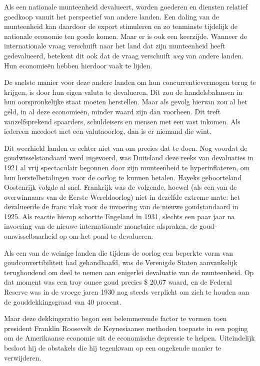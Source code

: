 \documentclass[smalldemyvopaper,11pt,twoside,onecolumn,openright,extrafontsizes,hidelinks]{memoir}
\begin{document}
Als een nationale munteenheid devalueert, worden goederen en diensten
relatief goedkoop vanuit het perspectief van andere landen. Een daling
van de munteenheid kan daardoor de export stimuleren en zo tenminste
tijdelijk de nationale economie ten goede komen. Maar er is ook een
keerzijde. Wanneer de internationale vraag verschuift naar het land dat
zijn munteenheid heeft gedevalueerd, betekent dit ook dat de vraag
verschuift \emph{weg} van andere landen. Hun economieën hebben hierdoor
vaak te lijden.

De snelste manier voor deze andere landen om hun concurrentievermogen
terug te krijgen, is door hun eigen valuta te devalueren. Dit zou de
handelsbalansen in hun oorspronkelijke staat moeten herstellen. Maar als
gevolg hiervan zou al het geld, in al deze economieën, minder waard zijn
dan voorheen. Dit treft vanzelfsprekend spaarders, schuldeisers en
mensen met een vast inkomen. Als iedereen meedoet met een valutaoorlog,
dan is er niemand die wint.

Dit weerhield landen er echter niet van om precies dat te doen. Nog
voordat de goudwisselstandaard werd ingevoerd, was Duitsland deze reeks
van devaluaties in 1921 al vrij spectaculair begonnen door zijn
munteenheid te hyperinflateren, om hun herstelbetalingen voor de oorlog
te kunnen betalen. Hayeks geboorteland Oostenrijk volgde al snel.
Frankrijk was de volgende, hoewel (als een van de overwinnaars van de
Eerste Wereldoorlog) niet in dezelfde extreme mate: het devalueerde de
franc vlak voor de invoering van de nieuwe goudstandaard in 1925. Als
reactie hierop schortte Engeland in 1931, slechts een paar jaar na
invoering van de nieuwe internationale monetaire afspraken, de
goud-omwisselbaarheid op om het pond te devalueren.

Als een van de weinige landen die tijdens de oorlog een beperkte vorm
van goudconvertibiliteit had gehandhaafd, was de Verenigde Staten
aanvankelijk terughoudend om deel te nemen aan enigerlei devaluatie van
de munteenheid. Op dat moment was een troy ounce goud precies \$ 20,67
waard, en de Federal Reserve was in de vroege jaren 1930 nog steeds
verplicht om zich te houden aan de gouddekkingsgraad van 40 procent.

Maar deze dekkingsratio begon een belemmerende factor te vormen toen
president Franklin Roosevelt de Keynesiaanse methoden toepaste in een
poging om de Amerikaanse economie uit de economische depressie te
helpen. Uiteindelijk besloot hij de obstakels die hij tegenkwam op een
ongekende manier te verwijderen.
\end{document}
